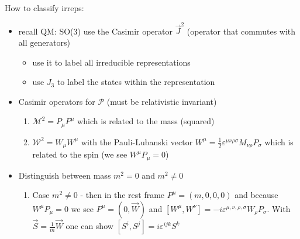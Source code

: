 \documentclass[10pt,a4paper]{article}
\theoremstyle{definition}
\begin{document}
How to classify irreps:
\begin{itemize}
\item recall QM: SO(3) use the Casimir operator $\vec{J}^2$ (operator that commutes with all generators) 
\begin{itemize}
\item use it to label all irreducible representations
\item use $J_3$ to label the states within the representation
\end{itemize}  
\item Casimir operators for $\mathcal{P}$ (must be relativistic invariant)
\begin{enumerate}
\item $\mathcal{M}^2=P_\mu P^\mu$ which is related to the mass (squared)
\item $\mathcal{W}^2=W_\mu W^{\mu}$ with the Pauli-Lubanski vector $W^\mu=\frac{1}{2}\varepsilon^{\mu\nu\rho\sigma}M_{\nu\rho}P_\sigma$ which is related to the spin (we see $W^\mu P_\mu=0$)
\end{enumerate}
\item Distinguish between mass $m^2=0$ and $m^2\neq0$
\begin{enumerate}
\item Case $m^2\neq0$ - then in the rest frame $P^\mu=(m,0,0,0)$ and because $W^\mu P_\mu=0$ we see $P^\mu=(0,\vec{W})$ and $[W^\mu,W^\nu]=-i\varepsilon^{\mu,\nu,\rho,\sigma}W_\rho P_\sigma$. With $\vec{S}=\frac{1}{m}\vec{W}$ one can show $[S^i,S^j]=i\varepsilon^{ijk}S^k$
\end{enumerate}
\end{itemize}

\newpage
\end{document}
